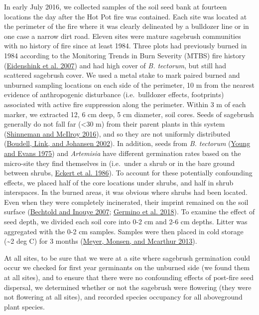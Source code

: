 \documentclass[
  12pt,
]{article}
\begin{document}
In early July 2016, we collected samples of the soil seed bank at
fourteen locations the day after the Hot Pot fire was contained. Each
site was located at the perimeter of the fire where it was clearly
delineated by a bulldozer line or in one case a narrow dirt road. Eleven
sites were mature sagebrush communities with no history of fire since at
least 1984. Three plots had previously burned in 1984 according to the
Monitoring Trends in Burn Severity (MTBS) fire history
(\protect\hyperlink{ref-Eidenshink2007}{Eidenshink et al. 2007}) and had
high cover of \emph{B. tectorum}, but still had scattered sagebrush
cover. We used a metal stake to mark paired burned and unburned sampling
locations on each side of the perimeter, 10 m from the nearest evidence
of anthropogenic disturbance (i.e.~bulldozer effects, footprints)
associated with active fire suppression along the perimeter. Within 3 m
of each marker, we extracted 12, 6 cm deep, 5 cm diameter, soil cores.
Seeds of sagebrush generally do not fall far (\textless30 m) from their
parent plants in this system
(\protect\hyperlink{ref-Shinneman2016}{Shinneman and McIlroy 2016}), and
so they are not uniformly distributed
(\protect\hyperlink{ref-Boudell2002}{Boudell, Link, and Johansen 2002}).
In addition, seeds from \emph{B. tectorum}
(\protect\hyperlink{ref-Young1975}{Young and Evans 1975}) and
\emph{Artemisia} have different germination rates based on the
micro-site they find themselves in (i.e.~under a shrub or in the bare
ground between shrubs, \protect\hyperlink{ref-Eckert1986}{Eckert et al.
1986}). To account for these potentially confounding effects, we placed
half of the core locations under shrubs, and half in shrub interspaces.
In the burned areas, it was obvious where shrubs had been located. Even
when they were completely incinerated, their imprint remained on the
soil surface (\protect\hyperlink{ref-Bechtold2007}{Bechtold and Inouye
2007}; \protect\hyperlink{ref-Germino2018}{Germino et al. 2018}). To
examine the effect of seed depth, we divided each soil core into 0-2 cm
and 2-6 cm depths. Litter was aggregated with the 0-2 cm samples.
Samples were then placed in cold storage (\textasciitilde2 deg C) for 3
months (\protect\hyperlink{ref-Meyer2013}{Meyer, Monsen, and Mcarthur
2013}).

At all sites, to be sure that we were at a site where sagebrush
germination could occur we checked for first year germinants on the
unburned side (we found them at all sites), and to ensure that there
were no confounding effects of post-fire seed dispersal, we determined
whether or not the sagebrush were flowering (they were not flowering at
all sites), and recorded species occupancy for all aboveground plant
species.
\end{document}

